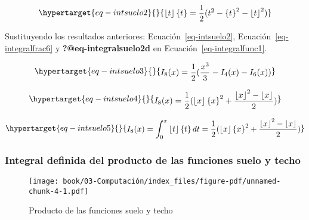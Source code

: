 \documentclass[
  letterpaper,
  DIV=11,
  numbers=noendperiod]{scrreprt}
\begin{document}
\begin{equation}\protect\hypertarget{eq-intsuelo2}{}{
\begin{multline}
\left\lfloor t \right\rfloor \left\{ t \right\} = 
\frac{1}{2}(t^2 - \left\{ t \right\}^2 - \left\lfloor t \right\rfloor^{2})
\end{multline}
}\label{eq-intsuelo2}\end{equation}

Sustituyendo los resultados anteriores: Ecuación~\ref{eq-intsuelo2},
Ecuación~\ref{eq-integralfrac6} y \textbf{?@eq-integralsuelo2d} en
Ecuación~\ref{eq-integralfunc1}.

\begin{equation}\protect\hypertarget{eq-intsuelo3}{}{
\begin{multline}
I_{8}(x)=\frac{1}{2} ( \frac{x^3}{3} - I_{4}(x) - I_{6}(x))
\end{multline}
}\label{eq-intsuelo3}\end{equation}

\begin{equation}\protect\hypertarget{eq-intsuelo4}{}{
\begin{multline}
I_{8}(x) = \frac{1}{2} (\left\lfloor x \right\rfloor \left\{ x \right\}^{2} +
\frac{{\left\lfloor x \right\rfloor}^{2} - \left\lfloor x \right\rfloor}{2})
\end{multline}
}\label{eq-intsuelo4}\end{equation}

\begin{equation}\protect\hypertarget{eq-intsuelo5}{}{
\begin{multline}
I_{8}(x) = \int_{0}^{x}{\left\lfloor t \right\rfloor \left\{ t \right\} dt} =
\frac{1}{2} ( \left\lfloor x \right\rfloor \left\{ x \right\}^2 + \frac{{\left\lfloor x \right\rfloor}^{2} - \left\lfloor x \right\rfloor}{2})
\end{multline}
}\label{eq-intsuelo5}\end{equation}

\hypertarget{integral-definida-del-producto-de-las-funciones-suelo-y-techo}{%
\subsubsection{Integral definida del producto de las funciones suelo y
techo}\label{integral-definida-del-producto-de-las-funciones-suelo-y-techo}}

\begin{figure}

{\centering \texttt{[image: book/03-Computación/index\_files/figure-pdf/unnamed-chunk-4-1.pdf]}

}

\caption{Producto de las funciones suelo y techo}

\end{figure}
\end{document}
